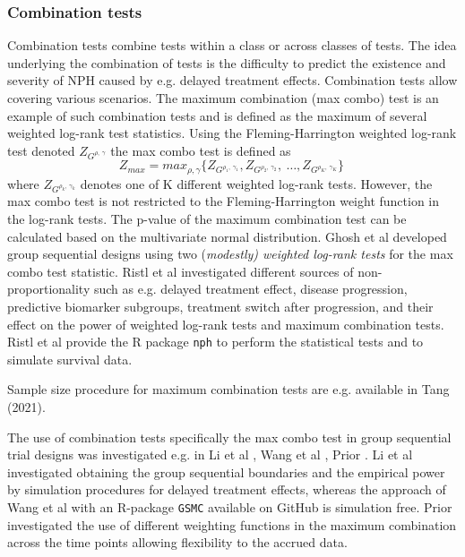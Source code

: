 \noindent \textit{}


\subsubsection{Combination tests} \label{combination}

\noindent 

\noindent Combination tests combine tests within a class or across classes of tests. The idea underlying the combination of tests is the difficulty to predict the existence and severity of NPH caused by e.g. delayed treatment effects. Combination tests allow covering various scenarios. The maximum combination (max combo) test is an example of such combination tests and is defined as the maximum of several weighted log-rank test statistics. Using the Fleming-Harrington weighted log-rank test denoted $Z_{G^{\rho ,\ \gamma }}$ the max combo test is defined as 
\[Z_{max}={max}_{\rho ,\gamma }\{Z_{G^{{\rho }_1,\ {\gamma }_1}},Z_{G^{{\rho }_2,\ {\gamma }_2}},\ \dots ,Z_{G^{{\rho }_K,\ {\gamma }_K}}\}\ \] 
where  $Z_{G^{{\rho }_k,\ {\gamma }_k}}$ denotes one of K different weighted log-rank tests. However, the max combo test is not restricted to the Fleming-Harrington weight function in the log-rank tests. The p-value of the maximum combination test can be calculated based on the multivariate normal distribution. Ghosh et al \cite{Ghosh.2022} developed  group sequential designs using two (\textit{modestly) weighted log-rank tests }for the max combo test statistic. Ristl et al \cite{Ristl.2021} investigated different sources of non-proportionality such as e.g. delayed treatment effect, disease progression, predictive biomarker subgroups, treatment switch after progression, and their effect on the power of weighted log-rank tests and maximum combination tests. Ristl et al \cite{Ristl.2021} provide the R package \texttt{nph} to perform the statistical tests and to simulate survival data.

\noindent Sample size procedure for maximum combination tests are e.g. available in Tang (2021).

\noindent The  use of combination tests specifically the max combo test in group sequential trial designs was investigated e.g. in Li et al \cite{Li.2022}, Wang et al \cite{Wang.2021}, Prior \cite{Prior.2020}. Li et al \cite{Li.2022} investigated obtaining the group sequential boundaries and the empirical power by simulation procedures for delayed treatment effects, whereas the approach of Wang et al \cite{Wang.2021} with an R-package \texttt{GSMC} available on GitHub is simulation free. Prior \cite{Prior.2020} investigated the use of different weighting functions in the maximum combination across the time points allowing flexibility to the accrued data. 

